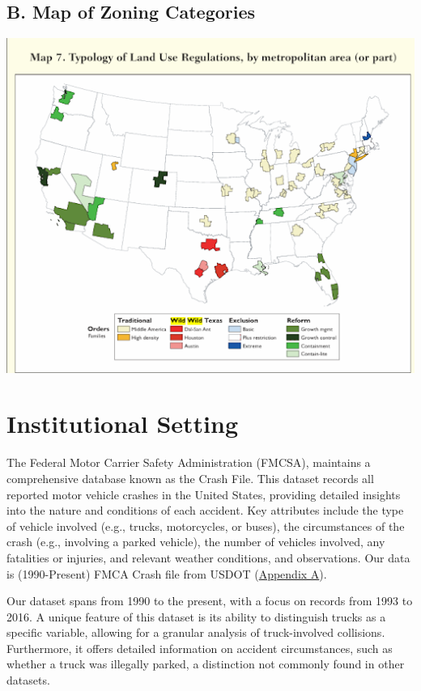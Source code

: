 \documentclass[
  12pt]{article}
\begin{document}
\subsection{B. Map of Zoning
Categories}\label{sec-b.-map-of-zoning-categories}

\includegraphics{images/unnamed (1).png}

\section{Institutional Setting}\label{institutional-setting}

The Federal Motor Carrier Safety Administration (FMCSA), maintains a
comprehensive database known as the Crash File. This dataset records all
reported motor vehicle crashes in the United States, providing detailed
insights into the nature and conditions of each accident. Key attributes
include the type of vehicle involved (e.g., trucks, motorcycles, or
buses), the circumstances of the crash (e.g., involving a parked
vehicle), the number of vehicles involved, any fatalities or injuries,
and relevant weather conditions, and observations. Our data is
(1990-Present) FMCA Crash file from USDOT
(\hyperref[sec-a.-visualization-of-dataset.-]{Appendix A}).

Our dataset spans from 1990 to the present, with a focus on records from
1993 to 2016. A unique feature of this dataset is its ability to
distinguish trucks as a specific variable, allowing for a granular
analysis of truck-involved collisions. Furthermore, it offers detailed
information on accident circumstances, such as whether a truck was
illegally parked, a distinction not commonly found in other datasets.
\end{document}
